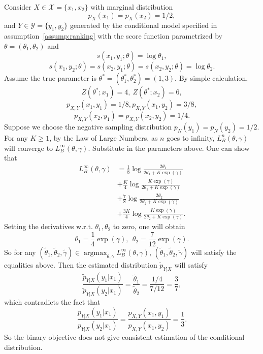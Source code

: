 \documentclass[11pt,a4paper]{article}
\newcommand{\wt}[1]{\widetilde{#1}}
\DeclareMathOperator*{\argmax}{argmax}
\begin{document}
Consider $X\in\mathcal{X} = \{x_1, x_2\}$ with marginal distribution 
\[
p_X(x_1) = p_X(x_2) = 1/2,
\]
and $Y\in \mathcal{Y} = \{y_1, y_2\}$ generated by the conditional model specified in assumption~\ref{assump:ranking} with  
the score function parametrized by $\theta = (\theta_1, \theta_2)$ and 
\[
s(x_1, y_1; \theta) = \log \theta_1,
\]
\vspace{-0.7cm}
\[
 s(x_1, y_2; \theta) =  s(x_2, y_1; \theta) = s(x_2, y_2; \theta) = \log \theta_2.
\]
Assume the true parameter is $\theta^* = (\theta^*_1, \theta_2^*) = (1, 3)$. By simple calculation, 
\[
Z(\theta^*; x_1) = 4, ~Z(\theta^*; x_2) = 6,
\]
\vspace{-0.7cm}
\[
p_{X, Y}(x_1, y_1) = 1/8,  p_{X, Y}(x_1, y_2) = 3/8,
\]
\vspace{-0.7cm}
\[
p_{X, Y}(x_2, y_1) = p_{X, Y}(x_2, y_2) = 1/4.
\]
Suppose we choose the negative sampling distribution $p_N(y_1) = p_N(y_2) = 1/2$. For any $K \geq 1$, by the Law of Large Numbers, as $n$ goes to infinity, $L_B^n(\theta, \gamma)$ will converge to $L_B^\infty(\theta, \gamma)$. Substitute in the parameters above. One can show that
\begin{equation*}
\begin{aligned}
L_B^\infty(\theta, \gamma) &=  \frac{1}{8} \log \frac{2\theta_1 }{2\theta_1+ K\exp(\gamma)}  \\
& + \frac{K}{4} \log \frac{K\exp(\gamma)}{2\theta_1  + K\exp(\gamma)}  \\
& + \frac{7}{8} \log \frac{2\theta_2 }{2\theta_2  + K \exp(\gamma)} \\
& + \frac{3K}{4} \log \frac{K\exp(\gamma)}{2\theta_2  + K\exp(\gamma)} .
\end{aligned}
\end{equation*}
Setting the derivatives w.r.t. $\theta_1, \theta_2$ to zero, one will obtain 
\[
\theta_1 = \frac{1}{4}\exp(\gamma), ~~\theta_2 = \frac{7}{12}\exp(\gamma).
\]
So for any $ (\wt{\theta}_1, \wt{\theta}_2, \wt{\gamma}) \in \argmax_{\theta,\gamma} L_B^\infty\left(\theta, \gamma \right)$, $(\wt{\theta}_1, \wt{\theta}_2, \wt{\gamma})$ will satisfy the equalities above. 
Then the estimated distribution $\wt{p}_{Y|X}$ will satisfy
\[
\frac{\wt{p}_{Y|X}(y_1| x_1)}{\wt{p}_{Y|X}(y_2|x_1)} = \frac{\wt{\theta}_1}{\wt{\theta}_2} = \frac{1/4}{7 / 12}= \frac{3}{7},
\]
which contradicts the fact that 
\[
\frac{p_{Y|X}(y_1|x_1)}{p_{Y|X}(y_2|x_1)} = \frac{p_{X,Y}(x_1, y_1)}{p_{X,Y}(x_1, y_2)} = \frac{1}{3}.
\]
So the binary objective does not give consistent estimation of the conditional distribution. 
\end{document}
